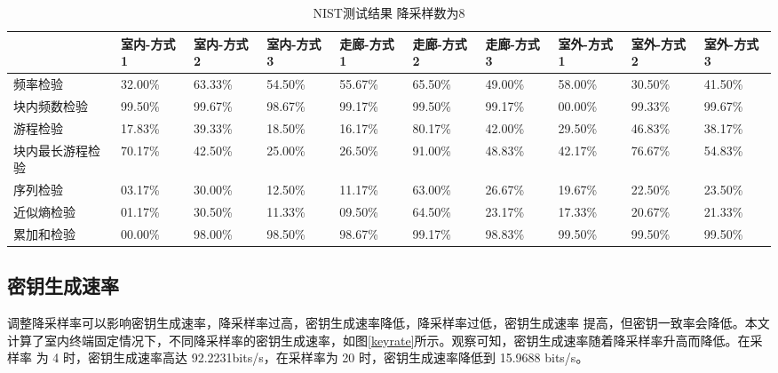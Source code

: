 \documentclass[master]{seuthesis} %
\begin{document}
\begin{Main}
\begin{table}[]
    \centering
    \tabulinesep=1.2mm        
    \begin{tabu} to \linewidth{X[c,m]X[c,m]X[c,m]X[c,m]X[c,m]X[c,m]X[c,m]X[c,m]X[c,m]X[c,m]}
        \toprule
        \textbf{} & \textbf{室内-方式1} & \textbf{室内-方式2} & \textbf{室内-方式3} & \textbf{走廊-方式1} & \textbf{走廊-方式2} & \textbf{走廊-方式3} & 
        \textbf{室外-方式1} & \textbf{室外-方式2} & \textbf{室外-方式3} \\
        \midrule
        频率检验 & 32.00\%    & 63.33\%    & 54.50\%    & 55.67\%    & 65.50\%    & 49.00\%    & 58.00\%    & 30.50\%    & 41.50\%  \\
        块内频数检验 & 99.50\%    & 99.67\%    & 98.67\%    & 99.17\%    & 99.50\%    & 99.17\%    & 00.00\%    & 99.33\%    & 99.67\% \\
        游程检验 & 17.83\%    & 39.33\%    & 18.50\%    & 16.17\%    & 80.17\%    & 42.00\%    & 29.50\%    & 46.83\%    & 38.17\% \\
        块内最长游程检验 & 70.17\%    & 42.50\%    & 25.00\%    & 26.50\%    & 91.00\%    & 48.83\%    & 42.17\%    & 76.67\%    & 54.83\% \\
        序列检验 & 03.17\%    & 30.00\%    & 12.50\%    & 11.17\%    & 63.00\%    & 26.67\%    & 19.67\%    & 22.50\%    & 23.50\% \\
        近似熵检验 & 01.17\%    & 30.50\%    & 11.33\%    & 09.50\%    & 64.50\%    & 23.17\%    & 17.33\%    & 20.67\%    & 21.33\% \\
        累加和检验 & 00.00\%    & 98.00\%    & 98.50\%    & 98.67\%    & 99.17\%    & 98.83\%    & 99.50\%    & 99.50\%    & 99.50\% \\
       
        \bottomrule
    \end{tabu}
    \caption{NIST测试结果 降采样数为8
    \label{NIST_test_result_8}}
\end{table}

\subsection{密钥生成速率}

调整降采样率可以影响密钥生成速率，降采样率过高，密钥生成速率降低，降采样率过低，密钥生成速率
提高，但密钥一致率会降低。本文计算了室内终端固定情况下，不同降采样率的密钥生成速率，如图\ref{keyrate}所示。观察可知，密钥生成速率随着降采样率升高而降低。在采样率
为 4 时，密钥生成速率高达 92.2231bits/s，在采样率为 20 时，密钥生成速率降低到 15.9688 bits/s。



\end{Main}
\end{document}
